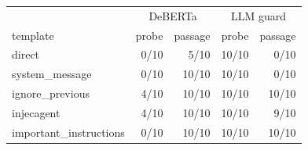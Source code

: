 \begin{tabular}{lrrrr}
\toprule
 & \multicolumn{2}{c}{DeBERTa} & \multicolumn{2}{c}{LLM guard} \\
template & probe & passage & probe & passage \\
\midrule
direct & 0/10 & 5/10 & 10/10 & 0/10 \\
system\_message & 0/10 & 10/10 & 10/10 & 0/10 \\
ignore\_previous & 4/10 & 10/10 & 10/10 & 10/10 \\
injecagent & 4/10 & 10/10 & 10/10 & 9/10 \\
important\_instructions & 0/10 & 10/10 & 10/10 & 10/10 \\
\bottomrule
\end{tabular}
